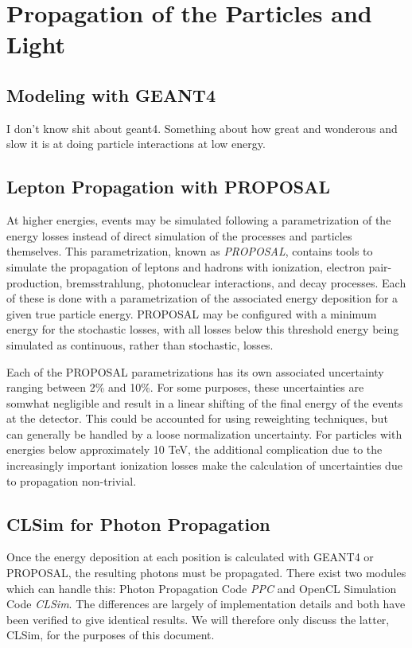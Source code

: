 \section{Propagation of the Particles and Light}
\label{sec:propagation}
\subsection{Modeling with GEANT4}
\label{subsec:geant}
I don't know shit about geant4.
Something about how great and wonderous and slow it is at doing particle interactions at low energy.

\subsection{Lepton Propagation with PROPOSAL}
\label{subsec:proposal}
At higher energies, events may be simulated following a parametrization of the energy losses instead of direct simulation of the processes and particles themselves.
This parametrization, known as \emph{PROPOSAL}, contains tools to simulate the propagation of leptons and hadrons with ionization, electron pair-production, bremsstrahlung, photonuclear interactions, and decay processes.
Each of these is done with a parametrization of the associated energy deposition for a given true particle energy.
PROPOSAL may be configured with a minimum energy for the stochastic losses, with all losses below this threshold energy being simulated as continuous, rather than stochastic, losses.

Each of the PROPOSAL parametrizations has its own associated uncertainty ranging between 2\% and 10\%.
For some purposes, these uncertainties are somwhat negligible and result in a linear shifting of the final energy of the events at the detector.
This could be accounted for using reweighting techniques, but can generally be handled by a loose normalization uncertainty.
For particles with energies below approximately 10 TeV, the additional complication due to the increasingly important ionization losses make the calculation of uncertainties due to propagation non-trivial.


\subsection{CLSim for Photon Propagation}
\label{subsec:clsim}
Once the energy deposition at each position is calculated with GEANT4 or PROPOSAL, the resulting photons must be propagated. 
There exist two modules which can handle this: Photon Propagation Code \emph{PPC} and OpenCL Simulation Code \emph{CLSim}. 
The differences are largely of implementation details and both have been verified to give identical results.
We will therefore only discuss the latter, CLSim, for the purposes of this document.

